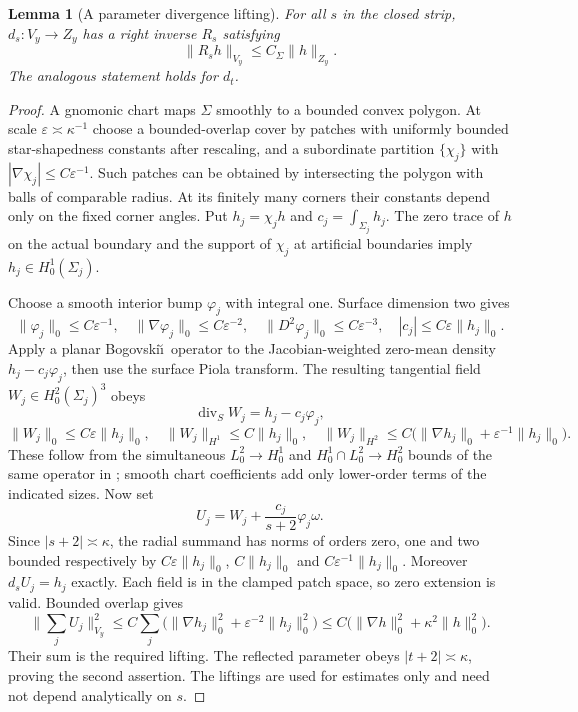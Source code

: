 \documentclass[11pt,a4paper]{article}
\newtheorem{lemma}[theorem]{Lemma}
\theoremstyle{remark}
\numberwithin{equation}{section}
\begin{document}
\begin{lemma}[A parameter divergence lifting]\label{lem:g-paramlift}
For all $s$ in the closed strip, $d_s:V_y\to Z_y$ has a right inverse
$R_s$ satisfying
\[
 \|R_sh\|_{V_y}\le C_\Sigma\|h\|_{Z_y}.
\]
The analogous statement holds for $d_t$.
\end{lemma}
\begin{proof}
A gnomonic chart maps $\Sigma$ smoothly to a bounded convex polygon. At scale
$\varepsilon\asymp\kappa^{-1}$ choose a bounded-overlap cover by patches
with uniformly bounded star-shapedness constants after rescaling, and a
subordinate partition $\{\chi_j\}$ with
$|\nabla\chi_j|\le C\varepsilon^{-1}$. Such patches can be obtained by
intersecting the polygon with balls of comparable radius. At its finitely many
corners their constants depend only on the fixed corner angles. Put
$h_j=\chi_jh$ and $c_j=\int_{\Sigma_j}h_j$. The zero trace of $h$ on the
actual boundary and the support of $\chi_j$ at artificial boundaries imply
$h_j\in H^1_0(\Sigma_j)$.

Choose a smooth interior bump $\varphi_j$ with integral one. Surface dimension
two gives
\[
 \|\varphi_j\|_0\le C\varepsilon^{-1},\quad
 \|\nabla\varphi_j\|_0\le C\varepsilon^{-2},\quad
 \|D^2\varphi_j\|_0\le C\varepsilon^{-3},\quad
 |c_j|\le C\varepsilon\|h_j\|_0.
\]
Apply a planar Bogovski\u\i\ operator to the Jacobian-weighted zero-mean
density $h_j-c_j\varphi_j$, then use the surface Piola transform. The resulting
tangential field $W_j\in H^2_0(\Sigma_j)^3$ obeys
\[
 \operatorname{div}_SW_j=h_j-c_j\varphi_j,
\]
\[
 \|W_j\|_0\le C\varepsilon\|h_j\|_0,\quad
 \|W_j\|_{H^1}\le C\|h_j\|_0,\quad
 \|W_j\|_{H^2}\le
 C\bigl(\|\nabla h_j\|_0+\varepsilon^{-1}\|h_j\|_0\bigr).
\]
These follow from the simultaneous $L^2_0\to H^1_0$ and
$H^1_0\cap L^2_0\to H^2_0$ bounds of the same operator in \cite{CostabelMcIntosh2010};
smooth chart coefficients add only lower-order terms of the indicated sizes.
Now set
\[
 U_j=W_j+\frac{c_j}{s+2}\varphi_j\omega.
\]
Since $|s+2|\asymp\kappa$, the radial summand has norms of orders zero, one
and two bounded respectively by
$C\varepsilon\|h_j\|_0$, $C\|h_j\|_0$ and
$C\varepsilon^{-1}\|h_j\|_0$. Moreover $d_sU_j=h_j$ exactly. Each field is
in the clamped patch space, so zero extension is valid. Bounded overlap gives
\[
 \Big\|\sum_j U_j\Big\|_{V_y}^2
 \le C\sum_j\bigl(\|\nabla h_j\|_0^2+
                         \varepsilon^{-2}\|h_j\|_0^2\bigr)
 \le C\bigl(\|\nabla h\|_0^2+\kappa^2\|h\|_0^2\bigr).
\]
Their sum is the required lifting. The reflected parameter obeys
$|t+2|\asymp\kappa$, proving the second assertion. The liftings are used for
estimates only and need not depend analytically on $s$.
\end{proof}
\end{document}
